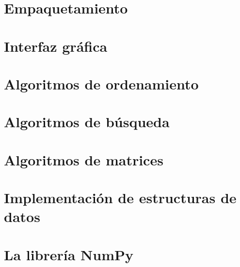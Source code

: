 \documentclass{report}
\begin{document}
\clearpage\chapter{Empaquetamiento}

\clearpage\chapter{Interfaz gráfica}

\clearpage\chapter{Algoritmos de ordenamiento}

\clearpage\chapter{Algoritmos de búsqueda}

\clearpage\chapter{Algoritmos de matrices}

\clearpage\chapter{Implementación de estructuras de datos}

\clearpage\chapter{La librería NumPy}
\end{document}
